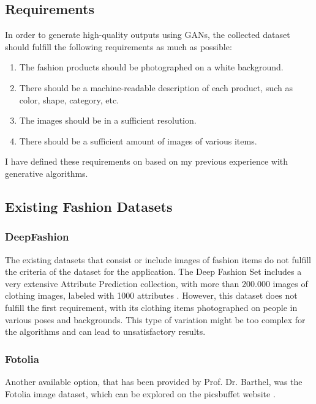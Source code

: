 \documentclass{article}
\begin{document}
\subsection {Requirements}
In order to generate high-quality outputs using GANs, the collected dataset should fulfill the following requirements as much as possible:
\begin{enumerate}
\item The fashion products should be photographed on a white background.
\item There should be a machine-readable description of each product, such as color, shape, category, etc.
\item The images should be in a sufficient resolution.
\item There should be a sufficient amount of images of various items.

\end{enumerate}
I have defined these requirements on based on my previous experience with generative algorithms. 

\subsection {Existing Fashion Datasets}

\subsubsection{DeepFashion}
The existing datasets that consist or include images of fashion items do not fulfill the criteria of the dataset for the application. The Deep Fashion Set includes a very extensive Attribute Prediction collection, with more than 200.000 images of clothing images, labeled with 1000 attributes \cite{the_chinese_university_of_hong_kong_deepfashion_nodate}. However, this dataset does not fulfill the first requirement, with its clothing items photographed on people in various poses and backgrounds. This type of variation might be too complex for the algorithms and can lead to unsatisfactory results.

\subsubsection{Fotolia}
Another available option, that has been provided by Prof. Dr. Barthel, was the Fotolia image dataset, which can be explored on the picsbuffet website \cite{noauthor_picsbuffet_nodate}.
\end{document}
